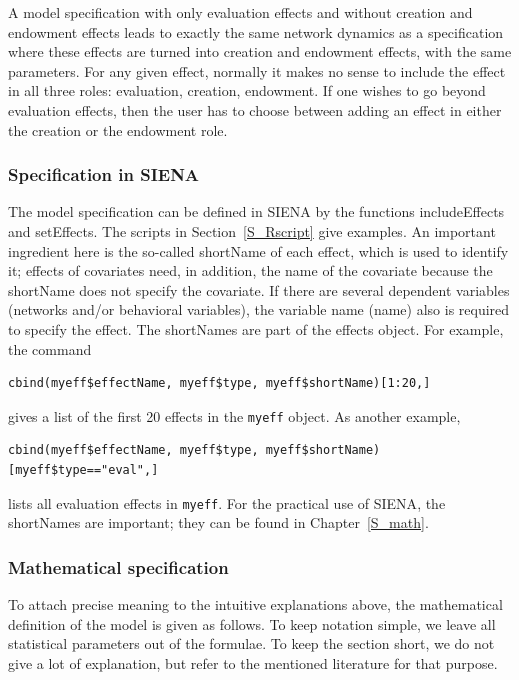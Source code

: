 \documentclass[a4paper,fleqn,11pt]{article}
\newcommand{\+}{\, + \,}
\newcommand{\sfn}[1]{\textsf{#1}}
\newcommand{\SI}{{\sf SIENA }}
\newcommand{\si}{{\sf SIENA}}
\begin{document}
{A model specification with only evaluation effects and without creation and
endowment effects leads to exactly the same network dynamics as a specification
where these effects are turned into creation and endowment effects,
with the same parameters.
For any given effect, normally it makes no sense to include the effect
in all three roles: evaluation, creation, endowment.
If one wishes to go beyond evaluation effects, then the user has to choose
between adding an effect in either the creation or the endowment role.

\subsubsection{Specification in \SI}

The model specification can be defined in \SI by the functions
\sfn{includeEffects} and \sfn{setEffects}.
The scripts in Section~\ref{S_Rscript} give examples.
An important ingredient here is the so-called \sfn{shortName}
of each effect, which is used to identify it;
effects of covariates need, in addition, the name of the covariate
because the \sfn{shortName} does not specify the covariate.
If there are several dependent variables (networks and/or behavioral variables),
the variable name (\sfn{name}) also is required to specify the effect.
The \sfn{shortName}s are part of the effects object.
For example, the command
\begin{verbatim}
cbind(myeff$effectName, myeff$type, myeff$shortName)[1:20,]
\end{verbatim}
gives a list of the first 20 effects in the \texttt{myeff} object.
As another example,
\begin{verbatim}
cbind(myeff$effectName, myeff$type, myeff$shortName)[myeff$type=="eval",]
\end{verbatim}
lists all evaluation effects in \texttt{myeff}.
For the practical use of \si, the \sfn{shortName}s are important;
they can be found in Chapter~\ref{S_math}.


\subsubsection{Mathematical specification}
\label{S_mathmod}

To attach precise meaning to the intuitive explanations above,
the mathematical definition of the model is given as follows.
To keep notation simple, we leave all statistical parameters out of the
formulae. To keep the section short, we do not give a lot of explanation,
but refer to the mentioned literature for that purpose.

}
\end{document}

